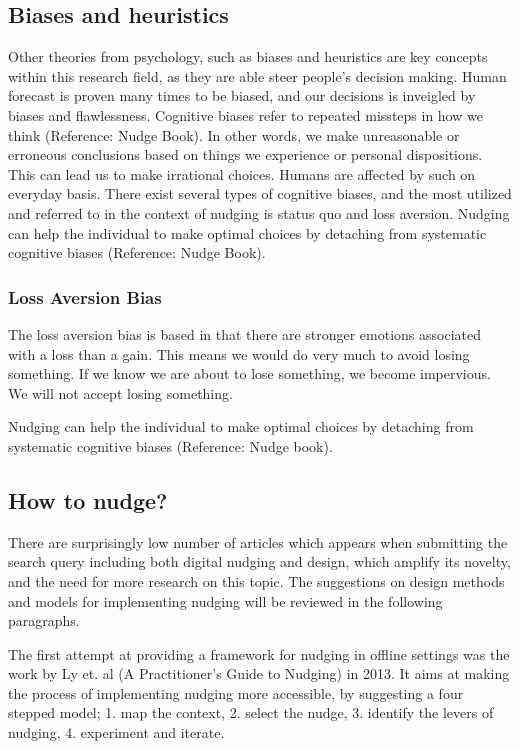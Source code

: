 {\subsection{Biases and heuristics }
Other theories from psychology, such as biases and heuristics are key concepts within this research field, as they are able steer people's decision making. Human forecast is proven many times to be biased, and our decisions is inveigled by biases and flawlessness. Cognitive biases refer to repeated missteps in how we think (Reference: Nudge Book). In other words, we make unreasonable or erroneous conclusions based on things we experience or personal dispositions. This can lead us to make irrational choices. Humans are affected by such on everyday basis. There exist several types of cognitive biases, and the most utilized and referred to in the context of nudging is status quo and loss aversion. Nudging can help the individual to make optimal choices by detaching from systematic cognitive biases (Reference: Nudge Book). 

\subsubsection{Loss Aversion Bias}
The loss aversion bias is based in that there are stronger emotions associated with a loss than a gain. This means we would do very much to avoid losing something. If we know we are about to lose something, we become impervious. We will not accept losing something.

Nudging can help the individual to make optimal choices by detaching from systematic cognitive biases (Reference: Nudge book). 

\subsection{How to nudge?}
There are surprisingly low number of articles which appears when submitting the search query including both digital nudging and design, which amplify its novelty, and the need for more research on this topic. The suggestions on design methods and models for implementing nudging will be reviewed in the following paragraphs. 

The first attempt at providing a framework for nudging in offline settings was the work by Ly et. al (A Practitioner’s Guide to Nudging) in 2013. It aims at making the process of implementing nudging more accessible, by suggesting a four stepped model; 1. map the context, 2. select the nudge, 3. identify the levers of nudging, 4. experiment and iterate. %

}
